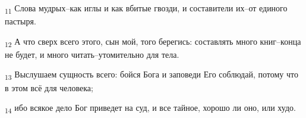 \begin{tcolorbox}
\textsubscript{11} Слова мудрых--как иглы и как вбитые гвозди, и составители их--от единого пастыря.
\end{tcolorbox}
\begin{tcolorbox}
\textsubscript{12} А что сверх всего этого, сын мой, того берегись: составлять много книг--конца не будет, и много читать--утомительно для тела.
\end{tcolorbox}
\begin{tcolorbox}
\textsubscript{13} Выслушаем сущность всего: бойся Бога и заповеди Его соблюдай, потому что в этом всё для человека;
\end{tcolorbox}
\begin{tcolorbox}
\textsubscript{14} ибо всякое дело Бог приведет на суд, и все тайное, хорошо ли оно, или худо.
\end{tcolorbox}

